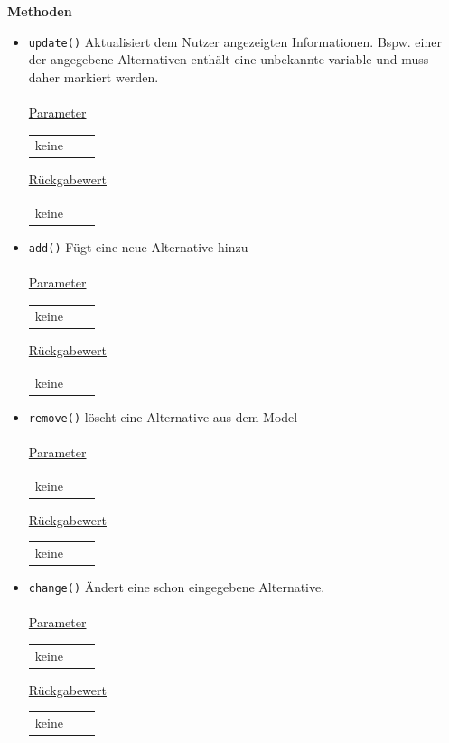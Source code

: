 \documentclass{article}
\begin{document}
\textbf{{Methoden}}
\begin{itemize}
\item \texttt{update()} \newline Aktualisiert dem Nutzer angezeigten Informationen. Bspw. einer der angegebene Alternativen enthält eine unbekannte variable und muss daher markiert werden.
\\\\
\underline{{Parameter}} 
\begin{tabular}{lll}
keine
\end{tabular}

\underline{{Rückgabewert}}
\begin{tabular}{lll}
keine
\end{tabular}

\item \texttt{add()} \newline Fügt eine neue Alternative hinzu
\\\\
\underline{{Parameter}} 
\begin{tabular}{lll}
keine
\end{tabular}

\underline{{Rückgabewert}}
\begin{tabular}{lll}
keine
\end{tabular}

\item \texttt{remove()} \newline löscht eine Alternative aus dem Model
\\\\
\underline{{Parameter}} 
\begin{tabular}{lll}
keine \\
\end{tabular}

\underline{{Rückgabewert}}
\begin{tabular}{lll}
keine\\
\end{tabular}

\item \texttt{change()} \newline Ändert eine schon eingegebene Alternative.
\\\\
\underline{{Parameter}} 
\begin{tabular}{lll}
keine \\
\end{tabular}

\underline{{Rückgabewert}}
\begin{tabular}{lll}
keine \\
\end{tabular}


\end{itemize}
\end{document}
